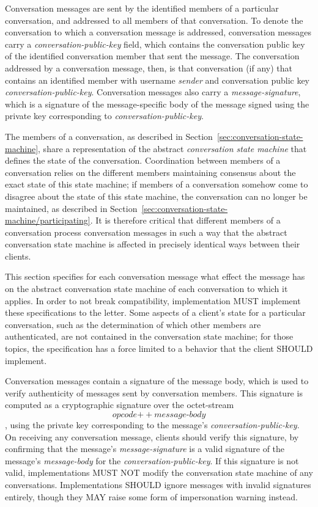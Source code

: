 \documentclass{article}
\def\field#1{\textit{#1}}
\def\concat{\mathbin{+\!\!\!+}}
\begin{document}
Conversation messages are sent by the identified members of a particular conversation, and addressed to all members of that conversation.
To denote the conversation to which a conversation message is addressed, conversation messages carry a \field{conversation-public-key} field, which contains the conversation public key of the identified conversation member that sent the message.
The conversation addressed by a conversation message, then, is that conversation (if any) that contains an identified member with username \field{sender} and conversation public key \field{conversation-public-key}.
Conversation messages also carry a \field{message-signature}, which is a signature of the message-specific body of the message signed using the private key corresponding to \field{conversation-public-key}.

The members of a conversation, as described in Section~\ref{sec:conversation-state-machine}, share a representation of the abstract \emph{conversation state machine} that defines the state of the conversation.
Coordination between members of a conversation relies on the different members maintaining consensus about the exact state of this state machine; if members of a conversation somehow come to disagree about the state of this state machine, the conversation can no longer be maintained, as described in Section~\ref{sec:conversation-state-machine/participating}.
It is therefore critical that different members of a conversation process conversation messages in such a way that the abstract conversation state machine is affected in precisely identical ways between their clients.

This section specifies for each conversation message what effect the message has on the abstract conversation state machine of each conversation to which it applies.
In order to not break compatibility, implementation MUST implement these specifications to the letter.
Some aspects of a client's state for a particular conversation, such as the determination of which other members are authenticated, are not contained in the conversation state machine; for those topics, the specification has a force limited to a behavior that the client SHOULD implement.

Conversation messages contain a signature of the message body, which is used to verify authenticity of messages sent by conversation members.
This signature is computed as a cryptographic signature over the octet-stream
$$\field{opcode} \concat \field{message-body}$$
, using the private key corresponding to the message's \field{conversation-public-key}.
On receiving any conversation message, clients should verify this signature, by confirming that the message's \field{message-signature} is a valid signature of the message's \field{message-body} for the \field{conversation-public-key}.
If this signature is not valid, implementations MUST NOT modify the conversation state machine of any conversations.
Implementations SHOULD ignore messages with invalid signatures entirely, though they MAY raise some form of impersonation warning instead.
\end{document}
